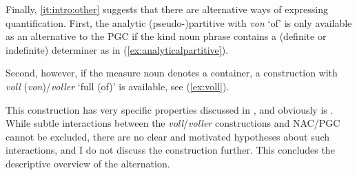 \documentclass[USenglish]{article}
\begin{document}
Finally, \ref{it:intro:other} suggests that there are alternative ways of expressing quantification.
First, the analytic (pseudo-)partitive with \textit{von} `of' is only available as an alternative to the PGC if the kind noun phrase contains a (definite or indefinite) determiner as in (\ref{ex:analyticalpartitive}).

\begin{exe}
  \ex\label{ex:analyticalpartitive} 
  \begin{xlist}
  \end{xlist}
\end{exe}

Second, however, if the measure noun denotes a container, a construction with \textit{voll} (\textit{von})\slash\textit{voller} `full (of)' is available, see (\ref{ex:voll}).

\begin{exe}
  \ex\label{ex:voll}
  \begin{xlist}
  \end{xlist}
\end{exe}

This construction has very specific properties discussed in \cite{Zeldes2018}, and obviously is .
While subtle interactions between the \textit{voll}\slash\textit{voller} constructions and NAC\slash PGC cannot be excluded, there are no clear and motivated hypotheses about such interactions, and I do not discuss the construction further.
This concludes the descriptive overview of the alternation.
\end{document}
